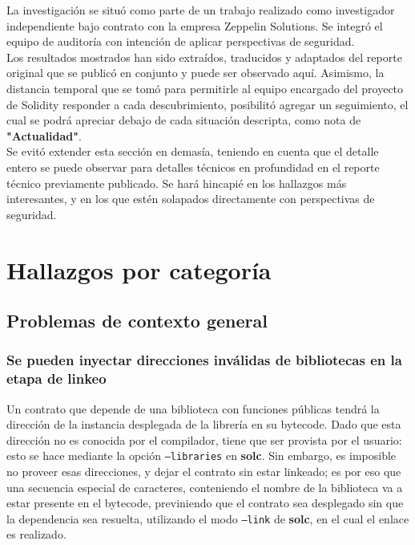 La investigación se situó como parte de un trabajo realizado como investigador independiente bajo contrato con la empresa Zeppelin Solutions. Se integró el equipo de auditoría con intención de aplicar perspectivas de seguridad.\\

Los resultados mostrados han sido extraídos, traducidos y adaptados del reporte original que se publicó en conjunto y puede ser observado aquí\cite{SolidityCompilerAuditReportZep}. Asimismo, la distancia temporal que se tomó para permitirle al equipo encargado del proyecto de Solidity responder a cada descubrimiento, posibilitó agregar un seguimiento, el cual se podrá apreciar debajo de cada situación descripta, como nota de \textbf{"Actualidad"}.\\

Se evitó extender esta sección en demasía, teniendo en cuenta que el detalle entero se puede observar para detalles técnicos en profundidad en el reporte técnico previamente publicado. Se hará hincapié en los hallazgos más interesantes, y en los que estén solapados directamente con perspectivas de seguridad.\\

\section{Hallazgos por categoría}
\subsection{Problemas de contexto general}
\subsubsection{Se pueden inyectar direcciones inválidas de bibliotecas en la etapa de linkeo
}

Un contrato que depende de una biblioteca con funciones públicas tendrá la dirección de la instancia desplegada de la librería en su bytecode. Dado que esta dirección no es conocida por el compilador, tiene que ser provista por el usuario: esto se hace mediante la opción \texttt{--libraries} en \textbf{solc}. Sin embargo, es imposible no proveer esas direcciones, y dejar el contrato sin estar linkeado; es por eso que una secuencia especial de caracteres, conteniendo el nombre de la biblioteca va a estar presente en el bytecode, previniendo que el contrato sea desplegado sin que la dependencia sea resuelta, utilizando el modo \texttt{--link} de \textbf{solc}, en el cual el enlace es realizado.\\

